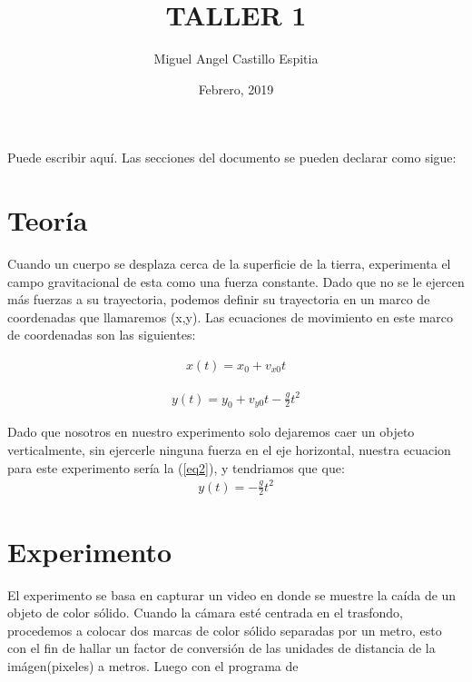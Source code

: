 \documentclass[12pt]{article}
\begin{document}
\title{TALLER 1}
\author{Miguel Angel Castillo Espitia}
\date{Febrero, 2019}
\maketitle

Puede escribir aquí. Las secciones del documento se pueden declarar como sigue:

\section{Teoría}

Cuando un cuerpo se desplaza cerca de la superficie de la tierra, experimenta el campo gravitacional de esta como una fuerza constante. Dado que no se le ejercen más fuerzas a su trayectoria, podemos definir su trayectoria en un marco de coordenadas que llamaremos (x,y). Las ecuaciones de movimiento en este marco de coordenadas son las siguientes:\



\begin{equation}
  \begin{aligned}
	  {x(t)}={x}_{0}+{v}_{x0}{t}
	  \label{eq1}
  \end{aligned}
\end{equation}

\begin{equation}
  \begin{gathered}
	  {y(t)}={y}_{0}+{v}_{y0}{t}-\frac{g}{2}{t^{2}}
	  \label{eq2}
  \end{gathered}
\end{equation}

Dado que nosotros en nuestro experimento solo dejaremos caer un objeto verticalmente, sin ejercerle ninguna fuerza en el eje horizontal, nuestra ecuacion para este experimento sería la (\ref{eq2}), y tendriamos que que:
\begin{equation}
  \begin{gathered}
	  {y(t)}=-\frac{g}{2}{t^{2}}
	  \label{eq3}
  \end{gathered}
\end{equation}
\section{Experimento}

El experimento se basa en capturar un video en donde se muestre la caída de un objeto de color sólido. Cuando la cámara esté centrada en el trasfondo, procedemos a colocar dos marcas de color sólido separadas por un metro, esto con el fin de hallar un factor de conversión de las unidades de distancia de la imágen(pixeles) a metros.
Luego con el programa de 
\end{document}
